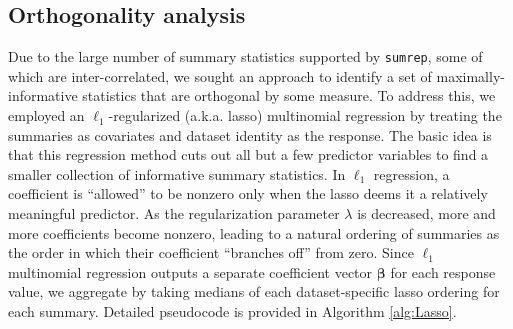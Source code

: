 \documentclass{article}
\begin{document}
\subsection*{Orthogonality analysis}
Due to the large number of summary statistics supported by \texttt{sumrep}, some of which are inter-correlated, we sought an approach to identify a set of maximally-informative statistics that are orthogonal by some measure.
To address this, we employed an $\ell_1$-regularized (a.k.a. lasso) multinomial regression by treating the summaries as covariates and dataset identity as the response.
The basic idea is that this regression method cuts out all but a few predictor variables to find a smaller collection of informative summary statistics.
In $\ell_1$ regression, a coefficient is ``allowed'' to be nonzero only when the lasso deems it a relatively meaningful predictor.
As the regularization parameter $\lambda$ is decreased, more and more coefficients  become nonzero, leading to a natural ordering of summaries as the order in which their coefficient ``branches off'' from zero.
Since $\ell_1$ multinomial regression outputs a separate coefficient vector $\boldsymbol \beta$ for each response value, we aggregate by taking medians of each dataset-specific lasso ordering for each summary.
Detailed pseudocode is provided in Algorithm \ref{alg:Lasso}.
\end{document}
